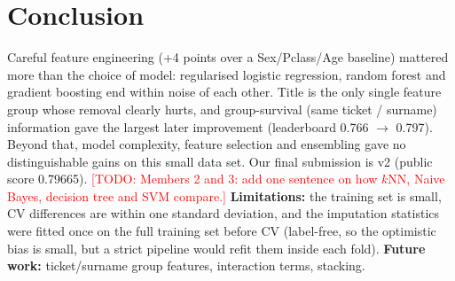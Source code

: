 \documentclass[10pt,twocolumn]{article}
\newcommand{\todo}[1]{\textcolor{red}{[TODO: #1]}}
\begin{document}
\section{Conclusion}
Careful feature engineering (+4 points over a Sex/Pclass/Age baseline) mattered more than the choice of model: regularised
logistic regression, random forest and gradient boosting end within noise of each other. Title is the only single feature group
whose removal clearly hurts, and group-survival
(same ticket / surname) information gave the largest later improvement (leaderboard 0.766 $\to$ 0.797).
Beyond that, model complexity, feature selection and ensembling gave no distinguishable gains on this small data set.
Our final submission is v2 (public score 0.79665). \todo{Members 2 and 3: add one sentence on how $k$NN, Naive Bayes, decision tree and SVM compare.}
\textbf{Limitations:} the training set is small, CV differences are within one standard deviation, and the imputation
statistics were fitted once on the full training set before CV (label-free, so the optimistic bias is small, but a strict
pipeline would refit them inside each fold). \textbf{Future work:} ticket/surname group features, interaction terms, stacking.
\end{document}
